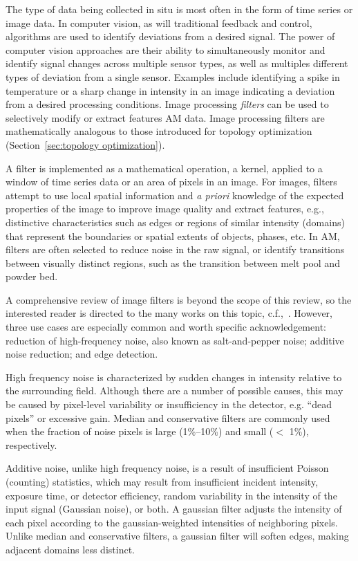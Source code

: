 The type of data being collected in situ is most often in the form of time series or image data. In computer vision, as will traditional feedback and control, algorithms are used to identify deviations from a desired signal. The power of computer vision approaches are their ability to simultaneously monitor and identify signal changes across multiple sensor types, as well as multiples different types of deviation from a single sensor. Examples include identifying a spike in temperature or a sharp change in intensity in an image indicating a deviation from a desired processing conditions. Image processing \textit{filters} can be used to selectively modify or extract features AM data. Image processing filters are mathematically analogous to those introduced for topology optimization (Section~\ref{sec:topology optimization}).

A filter is implemented as a mathematical operation, a kernel, applied to a window of time series data or an area of pixels in an image. For images, filters attempt to use local spatial information and \textit{a priori} knowledge of the expected properties of the image to improve image quality and extract features, e.g., distinctive characteristics such as edges or regions of similar intensity (domains) that represent the boundaries or spatial extents of objects, phases, etc. In AM, filters are often selected to reduce noise in the raw signal, or identify transitions between visually distinct regions, such as the transition between melt pool and powder bed.

A comprehensive review of image filters is beyond the scope of this review, so the interested reader is directed to the many works on this topic, c.f.,~\citet{Vernon1991}. However, three use cases are especially common and worth specific acknowledgement: reduction of high-frequency noise, also known as salt-and-pepper noise; additive noise reduction; and edge detection.

High frequency noise is characterized by sudden changes in intensity relative to the surrounding field. Although there are a number of possible causes, this may be caused by pixel-level variability or insufficiency in the detector, e.g. ``dead pixels'' or excessive gain. Median and conservative filters are commonly used when the fraction of noise pixels is large (1\%--10\%) and small ($<$ 1\%), respectively.

Additive noise, unlike high frequency noise, is a result of insufficient Poisson (counting) statistics, which may result from insufficient incident intensity, exposure time, or detector efficiency, random variability in the intensity of the input signal (Gaussian noise), or both. A gaussian filter adjusts the intensity of each pixel according to the gaussian-weighted intensities of neighboring pixels. Unlike median and conservative filters, a gaussian filter will soften edges, making adjacent domains less distinct.


